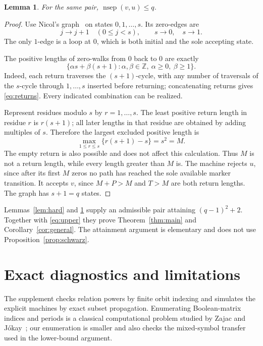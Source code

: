 \documentclass[11pt,a4paper]{article}
\newtheorem{lemma}[theorem]{Lemma}
\DeclareMathOperator{\nsep}{nsep}
\begin{document}
\begin{lemma}\label{lem:easy}
For the same pair, \(\nsep(v,u)\leq q\).
\end{lemma}
\begin{proof}
Use Nicol's graph~\cite[Figure~1]{nicol2026} on states \(0,1,\ldots,s\).
Its zero-edges are
\[
 j\longrightarrow j+1\quad(0\leq j<s),\qquad
 s\longrightarrow0,\quad s\longrightarrow1.
\]
The only \(1\)-edge is a loop at \(0\), which is both initial and
the sole accepting state.

The positive lengths of zero-walks from \(0\) back to \(0\) are exactly
\begin{equation}\label{eq:returns}
 \{\alpha s+\beta(s+1):\alpha,\beta\in\mathbb Z,\
      \alpha\geq0,\ \beta\geq1\}.
\end{equation}
Indeed, each return traverses the \((s+1)\)-cycle, with any number of
traversals of the \(s\)-cycle through \(1,\ldots,s\) inserted before
returning; concatenating returns gives \eqref{eq:returns}.
Every indicated combination can be realized.

Represent residues modulo \(s\) by \(r=1,\ldots,s\).
The least positive return length in residue \(r\) is \(r(s+1)\);
all later lengths in that residue are obtained by adding multiples
of \(s\). Therefore the largest excluded positive length is
\[
 \max_{1\leq r\leq s}\{r(s+1)-s\}=s^2=M.
\]
The empty return is also possible and does not affect this calculation.
Thus \(M\) is not a return length, while every length greater than \(M\)
is. The machine rejects \(u\), since after its first \(M\) zeros no path
has reached the sole available marker transition.
It accepts \(v\), since \(M+P>M\) and \(T>M\) are both return lengths.
The graph has \(s+1=q\) states.
\end{proof}

Lemmas~\ref{lem:hard} and \ref{lem:easy} supply an admissible pair
attaining \((q-1)^2+2\). Together with \eqref{eq:upper} they prove
Theorem~\ref{thm:main} and Corollary~\ref{cor:general}.
The attainment argument is elementary and does not use
Proposition~\ref{prop:schwarz}.

\section{Exact diagnostics and limitations}\label{sec:checks}

The supplement checks relation powers by finite orbit indexing and
simulates the explicit machines by exact subset propagation.
Enumerating Boolean-matrix indices and periods is a classical
computational problem studied by Zajac and J\'okay~\cite{zajac2012};
our enumeration is smaller and also checks the mixed-symbol transfer
used in the lower-bound argument.
\end{document}
